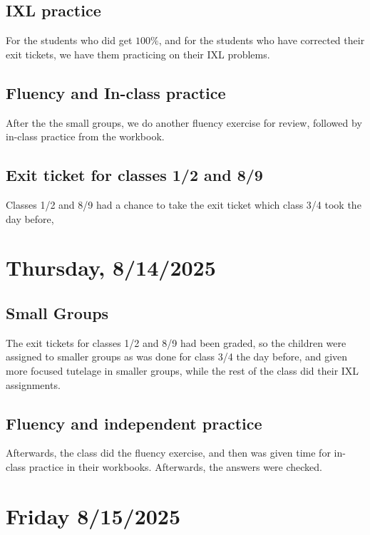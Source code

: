 \documentclass[11pt]{elegantbook}
\begin{document}
\section*{IXL practice}

For the students who did get $100\%$, and for the students who have
corrected their exit tickets, we have them practicing on their IXL
problems.

\section*{Fluency and In-class practice}

After the the small groups, we do another fluency exercise for review,
followed by in-class practice from the workbook.

\section*{Exit ticket for classes 1/2 and 8/9}

Classes 1/2 and 8/9 had a chance to take the exit ticket which class
3/4 took the day before,



\chapter{Thursday, 8/14/2025}

\section*{Small Groups}

The exit tickets for classes 1/2 and 8/9 had been graded, so the children
were assigned to smaller groups as was done for class 3/4 the day before, and
given more focused tutelage in smaller groups, while the rest of the class
did their IXL assignments.

\section*{Fluency and independent practice}

Afterwards, the class did the fluency exercise, and then was given
time for in-class practice in their workbooks.  Afterwards, the
answers were checked.


\chapter{Friday 8/15/2025}
\end{document}
